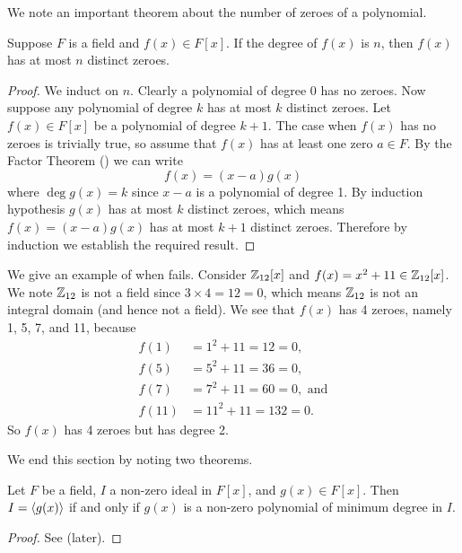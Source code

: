 We note an important theorem about the number of zeroes of a polynomial.
\begin{theorem}\label{thrm-polynomial-of-degree-n-has-at-most-n-zeroes}
    Suppose $F$ is a field and $f(x) \in F[x]$. If the degree of $f(x)$ is $n$, then $f(x)$ has at most $n$ distinct zeroes.
\end{theorem}
\begin{proof}
    We induct on $n$. Clearly a polynomial of degree 0 has no zeroes. Now suppose any polynomial of degree $k$ has at most $k$ distinct zeroes. Let $f(x) \in F[x]$ be a polynomial of degree $k + 1$. The case when $f(x)$ has no zeroes is trivially true, so assume that $f(x)$ has at least one zero $a \in F$. By the Factor Theorem () we can write
    \[
        f(x) = (x-a)g(x)
    \]
    where $\deg g(x) = k$ since $x-a$ is a polynomial of degree 1. By induction hypothesis $g(x)$ has at most $k$ distinct zeroes, which means $f(x) = (x-a)g(x)$ has at most $k + 1$ distinct zeroes. Therefore by induction we establish the required result.
\end{proof}

\begin{example}
    We give an example of when  fails. Consider $\mathbb{Z}_{12}[x]$ and $f(x) = x^2 + 11 \in \mathbb{Z}_{12}[x]$. We note $\mathbb{Z}_{12}$ is not a field since $3 \times 4 = 12 = 0$, which means $\mathbb{Z}_{12}$ is not an integral domain (and hence not a field). We see that $f(x)$ has 4 zeroes, namely 1, 5, 7, and 11, because
    \begin{align*}
        f(1) &= 1^2 + 11 = 12 = 0,\\
        f(5) &= 5^2 + 11 = 36 = 0,\\
        f(7) &= 7^2 + 11 = 60 = 0, \text{ and}\\
        f(11) &= 11^2 + 11 = 132 = 0.
    \end{align*}
    So $f(x)$ has 4 zeroes but has degree 2.
\end{example}

We end this section by noting two theorems.
\begin{theorem}\label{thrm-criterion-for-principal-ideal-in-polynomial-field}
    Let $F$ be a field, $I$ a non-zero ideal in $F[x]$, and $g(x) \in F[x]$. Then $I = \left\langle g(x)\right\rangle$ if and only if $g(x)$ is a non-zero polynomial of minimum degree in $I$.
\end{theorem}
\begin{proof}
    See  (later).
\end{proof}


